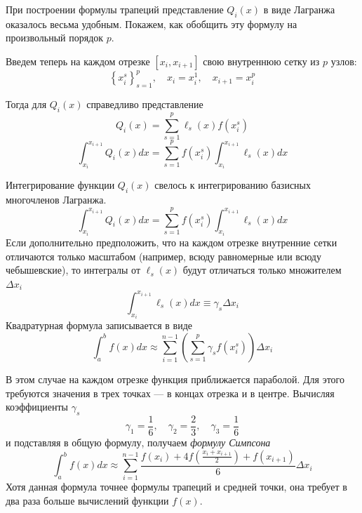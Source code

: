 \documentclass[professionalfonts,compress,unicode]{beamer}
\begin{document}
{
	При построении формулы трапеций представление $Q_i(x)$ в виде Лагранжа оказалось
	весьма удобным. Покажем, как обобщить эту формулу на произвольный порядок $p$.
	\pause
	
	Введем теперь на каждом отрезке $[x_i, x_{i+1}]$ свою внутреннюю сетку из $p$ узлов: 
	$$\left\{x_i^s\right\}_{s=1}^p,\quad x_i = x_i^1,\quad x_{i+1}=x_i^p$$
	\pause
	
	Тогда для $Q_i(x)$ справедливо представление
	$$
	Q_i(x) = \sum_{s=1}^p \ell_s(x) f(x_i^s)
	$$
	$$
	\int_{x_i}^{x_{i+1}} Q_i(x) dx = \sum_{s=1}^p f(x_i^s) \int_{x_i}^{x_{i+1}} \ell_s(x) dx
	$$	
}

{
	Интегрирование функции $Q_i(x)$ свелось к интегрированию базисных многочленов Лагранжа.
	$$
	\int_{x_i}^{x_{i+1}} Q_i(x) dx = \sum_{s=1}^p f(x_i^s) \int_{x_i}^{x_{i+1}} \ell_s(x) dx
	$$
	\pause
	Если дополнительно предположить, что на каждом отрезке внутренние сетки отличаются только масштабом 
	(например, всюду равномерные или всюду чебышевские), 
	то интегралы от $\ell_s(x)$ будут отличаться только множителем $\Delta x_i$
	$$
	\int_{x_i}^{x_{i+1}} \ell_s(x) dx \equiv \gamma_s \Delta x_i
	$$
	\pause
	Квадратурная формула записывается в виде
	$$
	\int_a^b f(x) dx \approx \sum_{i=1}^{n-1} \left(\sum_{s=1}^p \gamma_s f(x_i^s)\right)\Delta x_i
	$$
}

{
	В этом случае на каждом отрезке функция приближается параболой. Для этого требуются значения в трех точках ---
	в концах отрезка и в центре. Вычисляя коэффициенты $\gamma_s$ 
	$$
	\gamma_1 = \frac{1}{6}, \quad \gamma_2 = \frac{2}{3}, \quad \gamma_3 = \frac{1}{6}
	$$
	и подставляя в общую формулу, получаем \emph{формулу Симпсона}
	$$
	\int_a^b f(x) dx \approx \sum_{i=1}^{n-1} \frac{f(x_i) + 4f\left(\frac{x_i+x_{i+1}}{2}\right) + f(x_{i+1})}{6} \Delta x_i
	$$
	Хотя данная формула точнее формулы трапеций и средней точки, она требует в два раза больше вычислений функции $f(x)$.
	
}
\end{document}
